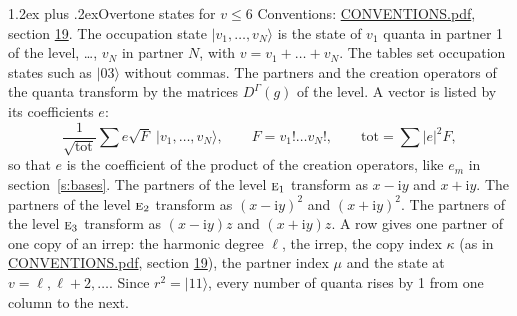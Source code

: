 \documentclass[10pt,a4paper]{article}
\makeatletter
\renewcommand\section{\@startsection{section}{1}{\z@}{-3ex plus -1ex minus -.2ex}%
  {1.2ex plus .2ex}{\normalfont\large\sffamily\bfseries\color{parttitle}}}
\numberwithin{equation}{section}
\newcommand{\irr}[1]{\text{\normalfont\scshape #1}}
\newcommand{\iunit}{\mathrm{i}}
\newcommand{\repD}[1]{D^{#1}}
\newcommand{\mult}{\kappa}
\newcommand{\intx}{\mu}
\newcommand{\occ}[1]{\lvert #1\rangle}
\makeatother
\begin{document}
\section{Overtone states for \texorpdfstring{$v \le 6$}{v \textleq\ 6}}\label{s:overtone_states}
Conventions: \href{../../CONVENTIONS.pdf}{CONVENTIONS.pdf}, section \href{../../CONVENTIONS.pdf\#conv.19}{19}.
\leavevmode\label{n:vector.occupation}\label{n:local.quanta.partner}\label{n:local.weight.occupation}The occupation state $\occ{v_1, \dots, v_N}$ is the state of $v_1$ quanta in partner 1 of the level, \dots, $v_N$ in partner $N$, with $v = v_1 + \dots + v_N$. The tables set occupation states such as $\occ{03}$ without commas. The partners and the creation operators of the quanta transform by the matrices $\repD{\Gamma}(g)$ of the level. A vector is listed by its coefficients $e$:
\begin{equation}\label{e:occupation}\frac{1}{\sqrt{\mathrm{tot}}}\sum e\sqrt{F}\;\occ{v_1, \dots, v_N},\qquad F = v_1!\dots v_N!,\qquad \mathrm{tot} = \sum |e|^2F,\end{equation}
so that $e$ is the coefficient of the product of the creation operators, like $e_m$ in section~\ref{s:bases}. The partners of the level $\irr{e}_{1}$ transform as $x - \iunit y$ and $x + \iunit y$. The partners of the level $\irr{e}_{2}$ transform as $(x - \iunit y)^{2}$ and $(x + \iunit y)^{2}$. The partners of the level $\irr{e}_{3}$ transform as $(x - \iunit y) z$ and $(x + \iunit y) z$. A row gives one partner of one copy of an irrep: the harmonic degree $\ell$, the irrep, the copy index $\mult$ (as in \href{../../CONVENTIONS.pdf}{CONVENTIONS.pdf}, section \href{../../CONVENTIONS.pdf\#conv.19}{19}), the partner index $\intx$ and the state at $v = \ell, \ell + 2, \dots$. Since $r^2 = \occ{11}$, every number of quanta rises by 1 from one column to the next.
\end{document}
